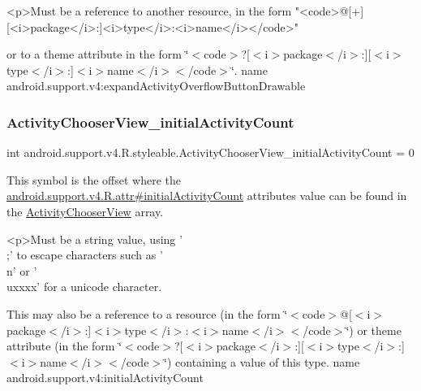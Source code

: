 \begin{DoxyVerb}      <p>Must be a reference to another resource, in the form "<code>@[+][<i>package</i>:]<i>type</i>:<i>name</i></code>"
\end{DoxyVerb}
 or to a theme attribute in the form \char`\"{}$<$code$>$?\mbox{[}$<$i$>$package$<$/i$>$\+:\mbox{]}\mbox{[}$<$i$>$type$<$/i$>$\+:\mbox{]}$<$i$>$name$<$/i$>$$<$/code$>$\char`\"{}.  name android.\+support.\+v4\+:expand\+Activity\+Overflow\+Button\+Drawable \mbox{\label{classandroid_1_1support_1_1v4_1_1R_1_1styleable_aa1a6488e82c41cad0b358240a62bd4bc}} 
\subsubsection{\texorpdfstring{Activity\+Chooser\+View\+\_\+initial\+Activity\+Count}{ActivityChooserView\_initialActivityCount}}
{\footnotesize\ttfamily int android.\+support.\+v4.\+R.\+styleable.\+Activity\+Chooser\+View\+\_\+initial\+Activity\+Count = 0\hspace{0.3cm}{\ttfamily [static]}}

This symbol is the offset where the \hyperlink{classandroid_1_1support_1_1v4_1_1R_1_1attr_a6e769e9a19c417859130f49992f57799}{android.\+support.\+v4.\+R.\+attr\#initial\+Activity\+Count} attribute\textquotesingle{}s value can be found in the \hyperlink{classandroid_1_1support_1_1v4_1_1R_1_1styleable_ab8c1a7f930b02f15ae84e9f2d388782a}{Activity\+Chooser\+View} array.

\begin{DoxyVerb}      <p>Must be a string value, using '\\;' to escape characters such as '\\n' or '\\uxxxx' for a unicode character.
\end{DoxyVerb}
 

This may also be a reference to a resource (in the form \char`\"{}$<$code$>$@\mbox{[}$<$i$>$package$<$/i$>$\+:\mbox{]}$<$i$>$type$<$/i$>$\+:$<$i$>$name$<$/i$>$$<$/code$>$\char`\"{}) or theme attribute (in the form \char`\"{}$<$code$>$?\mbox{[}$<$i$>$package$<$/i$>$\+:\mbox{]}\mbox{[}$<$i$>$type$<$/i$>$\+:\mbox{]}$<$i$>$name$<$/i$>$$<$/code$>$\char`\"{}) containing a value of this type.  name android.\+support.\+v4\+:initial\+Activity\+Count \mbox{\label{classandroid_1_1support_1_1v4_1_1R_1_1styleable_a5116e3c5b33ab9db032c1574d2588f5e}} 
